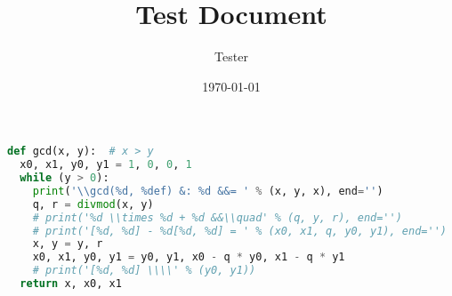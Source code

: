 \documentclass{article}
\title{Test Document}
\author{Tester}
\date{\today}
\begin{document}
 \maketitle


\begin{lstlisting}[language=python, caption={More python code.}, label=code1]
def gcd(x, y):  # x > y
  x0, x1, y0, y1 = 1, 0, 0, 1
  while (y > 0):
    print('\\gcd(%d, %def) &: %d &&= ' % (x, y, x), end='')
    q, r = divmod(x, y)
    # print('%d \\times %d + %d &&\\quad' % (q, y, r), end='')
    # print('[%d, %d] - %d[%d, %d] = ' % (x0, x1, q, y0, y1), end='')
    x, y = y, r
    x0, x1, y0, y1 = y0, y1, x0 - q * y0, x1 - q * y1
    # print('[%d, %d] \\\\' % (y0, y1))
  return x, x0, x1
\end{lstlisting}
\end{document}
